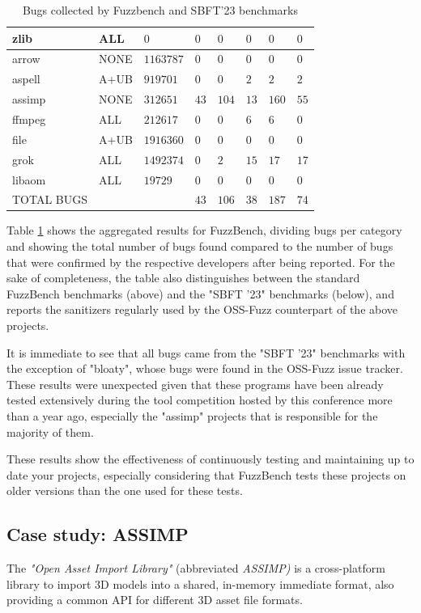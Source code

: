 \begin{table}[h]
{\begin{tabular}{|l|l|l|l|l|l|l|l|}
zlib   &ALL   &$0$   &$0$   &$0$   &$0$   &$0$   &$0$ \\
\hline
arrow   &NONE   &$1163787$   &$0$   &$0$   &$0$   &$0$   &$0$ \\
aspell   &A+UB   &$919701$   &$0$   &$0$   &$2$   &$2$   &$2$ \\
assimp   &NONE   &$312651$   &$43$   &$104$   &$13$   &$160$   &$55$ \\
ffmpeg   &ALL   &$212617$   &$0$   &$0$   &$6$   &$6$   &$0$ \\
file   &A+UB   &$1916360$   &$0$   &$0$   &$0$   &$0$   &$0$ \\
grok   &ALL   &$1492374$   &$0$   &$2$   &$15$   &$17$   &$17$ \\
libaom   &ALL   &$19729$   &$0$   &$0$   &$0$   &$0$   &$0$ \\
\hline
TOTAL BUGS   &   &   &$43$   &$106$   &$38$   &$187$   &$74$          \\
\hline
\end{tabular}}
\vspace{10pt}
\caption{Bugs collected by Fuzzbench and SBFT'23 benchmarks}
\label{fuzzbench-table}
\end{table}
Table \ref{fuzzbench-table} shows the aggregated results for FuzzBench, dividing bugs per category and showing the total number of bugs found compared to the number of bugs that were confirmed by the respective developers after being reported. For the sake of completeness, the table also distinguishes between the standard FuzzBench benchmarks (above) and the "SBFT '23" benchmarks (below), and reports the sanitizers regularly used by the OSS-Fuzz counterpart of the above projects.

It is immediate to see that all bugs came from the "SBFT '23" benchmarks with the exception of "bloaty", whose bugs were found in the OSS-Fuzz issue tracker. These results were unexpected given that these programs have been already tested extensively during the tool competition hosted by this conference more than a year ago, especially the "assimp" projects that is responsible for the majority of them.

These results show the effectiveness of continuously testing and maintaining up to date your projects, especially considering that FuzzBench tests these projects on older versions than the one used for these tests. 






\newpage
\subsection{Case study: ASSIMP}
The \textit{"Open Asset Import Library"} (abbreviated \textit{ASSIMP)} \cite{assimp} is a cross-platform library to import 3D models into a shared, in-memory immediate format, also providing a common API for different 3D asset file formats.

